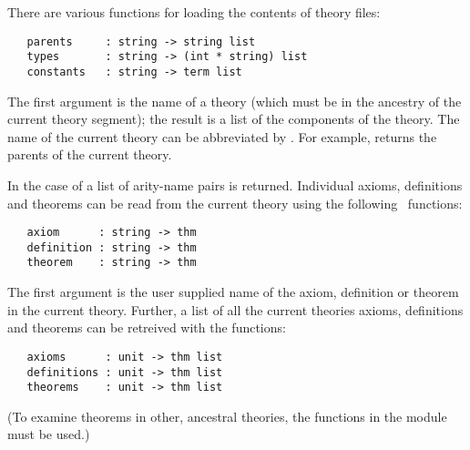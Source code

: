 There are various functions for loading the contents of theory files:

\begin{boxed}
\begin{verbatim}
   parents     : string -> string list
   types       : string -> (int * string) list
   constants   : string -> term list
\end{verbatim}\end{boxed}

\noindent The first argument is the name of a theory (which must be in the
ancestry of the current theory segment); the result is a list of the
components of the theory. The name of the current theory can be
abbreviated by . For
example,  returns the parents of the current theory.

In the case of  a list of arity-name pairs is returned.
Individual axioms, definitions and theorems can be read from the
current theory using the following \ML\ functions:

\begin{boxed}
\begin{verbatim}
   axiom      : string -> thm
   definition : string -> thm
   theorem    : string -> thm
\end{verbatim}\end{boxed}

\noindent The  first  argument  is the user  supplied name  of the axiom,
definition or theorem in the current theory.  Further, a list of all
the current theories axioms, definitions and theorems can be retreived
with the \ML{} functions:

\begin{boxed}
\begin{verbatim}
   axioms      : unit -> thm list
   definitions : unit -> thm list
   theorems    : unit -> thm list
\end{verbatim}\end{boxed}

\noindent (To examine theorems in other, ancestral theories, the
functions in the  module must be used.)

